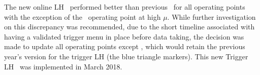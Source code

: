 The new online LH \tune\ performed better than previous \tune\ for all operating points with the exception of the \Medium\ operating point at high $\mu$.
While further investigation on this discrepancy was recommended, due to the short timeline associated with having a validated trigger menu in place before data taking, the decision was made to update all operating points except \Medium, which would retain the previous year's version for the trigger LH (the blue triangle markers).
This new Trigger LH \tune\ was implemented in March 2018.



